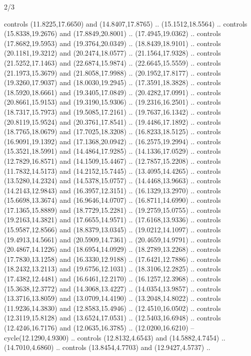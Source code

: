 \begin{flagdescription}{2/3}
\begin{scope}[yshift=\flagwidth,scale=\flagwidth/1241.93737]
\begin{scope}[y=-1mm, x=1mm,draw=gold,fill=blue,line join=miter,miter limit=4,line width=1.8\lw]
\begin{scope}[y=1mm, x=1mm, yscale=-1,shift={(573.68mm+\str,145.75)}]
\begin{scope}[scale=1.35,shift={(-9,-3)}]
\begin{scope}[scale=0.55]
\begin{scope}[scale=1.333]
    controls (11.8225,17.6650) and (14.8407,17.8765) .. (15.1512,18.5564) ..
    controls (15.8338,19.2676) and (17.8849,20.8001) .. (17.4945,19.0362) ..
    controls (17.8682,19.5953) and (19.3764,20.0349) .. (18.8439,18.9101) ..
    controls (20.1181,19.3212) and (20.2474,18.0577) .. (21.1564,17.9328) ..
    controls (21.5252,17.1463) and (22.6874,15.9874) .. (22.6645,15.5559) ..
    controls (21.1973,15.3679) and (21.8058,17.9988) .. (20.1952,17.8177) ..
    controls (19.3260,17.9037) and (18.0030,19.2945) .. (17.3591,18.3828) ..
    controls (18.5920,18.6661) and (19.3405,17.0849) .. (20.4282,17.0991) ..
    controls (20.8661,15.9153) and (19.3190,15.9306) .. (19.2316,16.2501) ..
    controls (18.7317,15.7973) and (19.5085,17.2161) .. (19.7637,16.1342) ..
    controls (20.8119,15.9524) and (20.3761,17.8541) .. (19.4486,17.1892) ..
    controls (18.7765,18.0679) and (17.7025,18.3208) .. (16.8233,18.5125) ..
    controls (16.9091,19.1392) and (17.1368,20.0942) .. (16.2575,19.2994) ..
    controls (15.3521,18.5991) and (14.4864,17.9285) .. (14.1336,17.0529) ..
    controls (12.7829,16.8571) and (14.1509,15.4467) .. (12.7857,15.2208) ..
    controls (11.7832,14.5173) and (14.2152,15.7445) .. (13.4095,14.4265) ..
    controls (13.5280,14.2324) and (14.5378,15.0757) .. (14.4468,13.9663) ..
    controls (14.2143,12.9843) and (16.3957,12.3151) .. (16.1329,13.2970) ..
    controls (15.6698,13.3674) and (16.9646,14.0707) .. (16.8711,14.6990) ..
    controls (17.1365,15.8889) and (18.7729,15.2281) .. (19.2759,15.0755) ..
    controls (19.2163,14.3821) and (17.6655,14.9571) .. (17.6168,13.9336) ..
    controls (15.9587,12.8566) and (18.8379,13.0345) .. (19.0212,14.1097) ..
    controls (19.4913,14.5661) and (20.5909,14.7361) .. (20.4659,14.9791) ..
    controls (20.4867,14.1226) and (18.6954,14.0929) .. (18.2789,13.2268) ..
    controls (17.7830,13.1258) and (16.3330,12.9188) .. (17.6421,12.7886) ..
    controls (18.2432,13.2113) and (19.6756,12.1031) .. (18.3106,12.2825) ..
    controls (17.4382,12.4481) and (16.6461,12.2170) .. (16.1257,12.3968) ..
    controls (15.3638,12.3772) and (14.3068,13.4227) .. (14.0354,13.9857) ..
    controls (13.3716,13.8059) and (13.0709,14.4190) .. (13.2048,14.8022) ..
    controls (11.9236,14.3830) and (12.8583,15.4946) .. (12.4510,16.0502) ..
    controls (12.3119,15.8128) and (13.6524,17.0531) .. (12.5403,16.6948) ..
    controls (12.4246,16.7176) and (12.0635,16.3785) .. (12.0200,16.6210) --
    cycle(12.1290,4.9300) .. controls (12.8132,4.6543) and (14.5882,4.7454) ..
    (14.7010,4.6860) .. controls (13.8454,4.7703) and (12.9427,4.5737) ..

\end{scope}
\end{scope}
\end{scope}
\end{scope}
\end{scope}
\end{scope}
\end{flagdescription}
